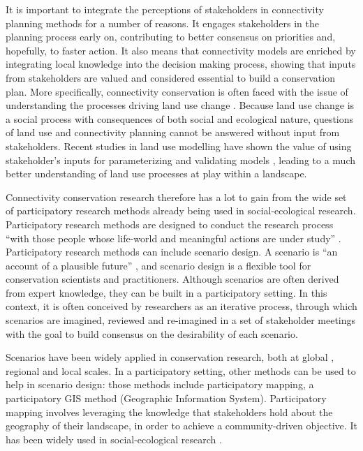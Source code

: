 It is important to integrate the perceptions of stakeholders in connectivity planning methods for a number of reasons. It engages stakeholders in the planning process early on, contributing to better consensus on priorities and, hopefully, to faster action. It also means that connectivity models are enriched by integrating local knowledge into the decision making process, showing that inputs from stakeholders are valued and considered essential to build a conservation plan. More specifically, connectivity conservation is often faced with the issue of understanding the processes driving land use change \citep{worboys_connectivity_2010}. Because land use change is a social process with consequences of both social and ecological nature, questions of land use and connectivity planning cannot be answered without input from stakeholders. Recent studies in land use modelling have shown the value of using stakeholder’s inputs for parameterizing and validating models \citep{hewitt_participatory_2014, voinov_modelling_2010}, leading to a much better understanding of land use processes at play within a landscape.

Connectivity conservation research therefore has a lot to gain from the wide set of participatory research methods already being used in social-ecological research. Participatory research methods are designed to conduct the research process “with those people whose life-world and meaningful actions are under study” \citep{bergold_participatory_2012}. Participatory research methods can include scenario design. A scenario is “an account of a plausible future” \citep{peterson_scenario_2003}, and scenario design is a flexible tool for conservation scientists and practitioners. Although scenarios are often derived from expert knowledge, they can be built in a participatory setting. In this context, it is often conceived by researchers as an iterative process, through which scenarios are imagined, reviewed and re-imagined in a set of stakeholder meetings with the goal to build consensus on the desirability of each scenario. 

Scenarios have been widely applied in conservation research, both at global \citep{tscharntke_global_2012, brussaard_reconciling_2010}, regional and local \citep{carlson_scenario_2011, delevaux_scenario_2018} scales. In a participatory setting, other methods can be used to help in scenario design: those methods include participatory mapping, a participatory GIS method (Geographic Information System). Participatory mapping involves leveraging the knowledge that stakeholders hold about the geography of their landscape, in order to achieve a community-driven objective. It has been widely used in social-ecological research \citep{plieninger_assessing_2013, lynam_review_2007}. 

